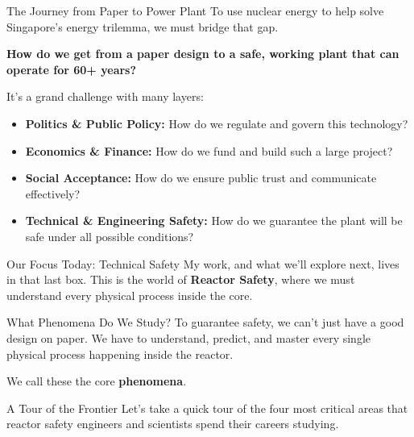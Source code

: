 \documentclass[aspectratio=169]{beamer}
\begin{document}
\begin{frame}[allowframebreaks]{The Journey from Paper to Power Plant}
    To use nuclear energy to help solve Singapore's energy trilemma, we must bridge that gap.
    
    \vspace{1em}
    \textbf{How do we get from a paper design to a safe, working plant that can operate for 60+ years?}
    
    \vspace{1em}
    It's a grand challenge with many layers:
    \begin{itemize}
        \item \textbf{Politics \& Public Policy:} How do we regulate and govern this technology?
        \item \textbf{Economics \& Finance:} How do we fund and build such a large project?
        \item \textbf{Social Acceptance:} How do we ensure public trust and communicate effectively?
        \item \textbf{Technical \& Engineering Safety:} How do we guarantee the plant will be safe under all possible conditions?
    \end{itemize}
    
    \vspace{1em}
    \begin{alertblock}{Our Focus Today: Technical Safety}
        My work, and what we'll explore next, lives in that last box. This is the world of \textbf{Reactor Safety}, where we must understand every physical process inside the core.
    \end{alertblock}
\end{frame}


\begin{frame}[allowframebreaks]{What Phenomena Do We Study?}
    To guarantee safety, we can't just have a good design on paper. We have to understand, predict, and master every single physical process happening inside the reactor.

    \vspace{1.5em}
    We call these the core \textbf{phenomena}.
    
    \vspace{1.5em}
    \begin{block}{A Tour of the Frontier}
        Let's take a quick tour of the four most critical areas that reactor safety engineers and scientists spend their careers studying.
    \end{block}
\end{frame}
\end{document}
